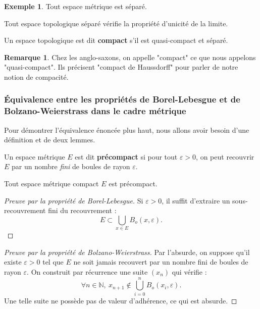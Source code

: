 \documentclass[french]{article}
\newcommand{\N}{\mathbb{N}}
\theoremstyle{plain}
\theoremstyle{definition}
\newtheorem*{ex}{Exemple}
\newtheorem*{rmq}{Remarque}
\theoremstyle{remark}
\begin{document}
\begin{ex}
	Tout espace métrique est séparé.
\end{ex}

\begin{prop}%
	Tout espace topologique séparé vérifie la propriété d'unicité de la limite.
\end{prop}

\begin{dfn}
	Un espace topologique est dit \textbf{compact} s'il est quasi-compact et séparé.
\end{dfn}

\begin{rmq}
	Chez les anglo-saxons, on appelle "compact" ce que nous appelons "quasi-compact". Ils précisent "compact de Haussdorff" pour parler de notre notion de compacité.
\end{rmq}

\subsubsection*{Équivalence entre les propriétés de Borel-Lebesgue et de Bolzano-Weierstrass dans le cadre métrique}

Pour démontrer l'équivalence énoncée plus haut, nous allons avoir besoin d'une définition et de deux lemmes.

\begin{dfn}
	Un espace métrique $E$ est dit \textbf{précompact} si pour tout $\varepsilon>0$, on peut recouvrir $E$ par un nombre \textit{fini} de boules de rayon $\varepsilon$.
\end{dfn}

\begin{lem}%
	Tout espace métrique compact $E$ est précompact.
\end{lem}
\begin{proof}[Preuve par la propriété de Borel-Lebesgue]
	Si $\varepsilon>0$, il suffit d'extraire un sous-recouvrement fini du recouvrement : $$E\subset\bigcup_{x\in E}B_o(x,\varepsilon).$$
\end{proof}
\begin{proof}[Preuve par la propriété de Bolzano-Weierstrass]
	Par l'absurde, on suppose qu'il existe $\varepsilon>0$ tel que $E$ ne soit jamais recouvert par un nombre fini de boules de rayon $\varepsilon$. On construit par récurrence une suite $(x_n)$ qui vérifie : $$\forall n\in\N,\ x_{n+1}\notin\bigcup_{i=0}^nB_o(x_i,\varepsilon).$$ Une telle suite ne possède pas de valeur d'adhérence, ce qui est absurde.
\end{proof}
\end{document}
